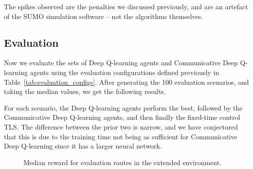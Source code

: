 \documentclass[a4paper]{report}
\begin{document}
The spikes observed are the penalties we discussed previously, and are an artefact of the SUMO simulation software -- not the algorithms themselves.

\subsection{Evaluation}

Now we evaluate the sets of Deep Q-learning agents and Communicative Deep Q-learning agents using the evaluation configurations defined previously in Table~\ref{tab:evaluation_configs}. After generating the 100 evaluation scenarios, and taking the median values, we get the following results.

For each scenario, the Deep Q-learning agents perform the best, followed by the Communicative Deep Q-learning agents, and then finally the fixed-time control TLS. The difference between the prior two is narrow, and we have conjectured that this is due to the training time not being as sufficient for Communicative Deep Q-learning since it has a larger neural network.

\begin{figure}[H]
  \centering
  \caption{Median reward for evaluation routes in the extended environment.}
  \label{fig:communicative_deep_q_learning_extended_eval}
\end{figure}
\end{document}
